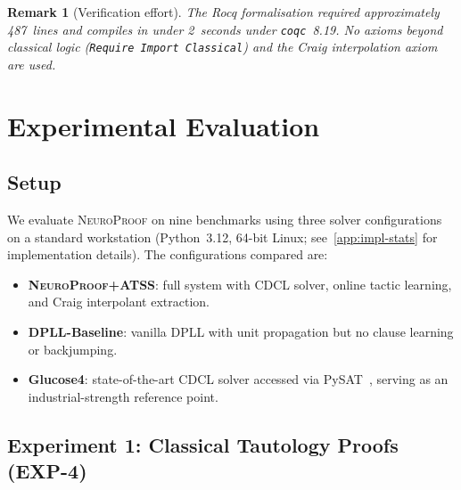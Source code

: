 \documentclass[conference]{IEEEtran}
\newtheorem{remark}[theorem]{Remark}
\newcommand{\NP}{\textsc{NeuroProof}}
\newcommand{\ATSS}{\textsc{ATSS}}
\begin{document}
\begin{remark}[Verification effort]
  The Rocq formalisation required approximately 487~lines and
  compiles in under 2~seconds under \texttt{coqc}~8.19.  No
  axioms beyond classical logic (\texttt{Require Import Classical})
  and the Craig interpolation axiom are used.
\end{remark}

\section{Experimental Evaluation}
\label{sec:experiments}

\subsection{Setup}

We evaluate \NP{} on nine benchmarks using three solver configurations
on a standard workstation (Python~3.12, 64-bit Linux; %
see~\cref{app:impl-stats} for implementation details).  The
configurations compared are:
\begin{itemize}
  \item \textbf{\NP{}+\ATSS{}}: full system with CDCL solver,
    online tactic learning, and Craig interpolant extraction.
  \item \textbf{DPLL-Baseline}: vanilla DPLL with unit propagation
    but no clause learning or backjumping.
  \item \textbf{Glucose4}: state-of-the-art CDCL solver accessed via
    PySAT~\cite{EenSorensson2003}, serving as an industrial-strength
    reference point.
\end{itemize}

\subsection{Experiment 1: Classical Tautology Proofs \textnormal{(EXP-4)}}
\end{document}
